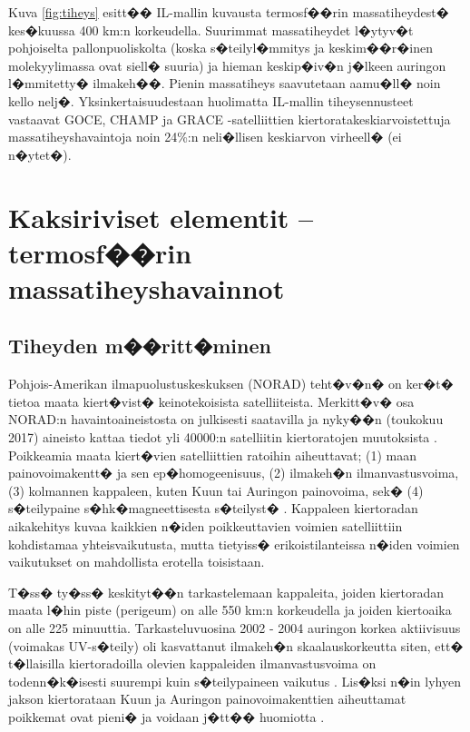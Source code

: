 \documentclass[12pt,a4paper,finnish,margin=2in]{article}
\begin{document}
Kuva \ref{fig:tiheys} esitt�� IL-mallin kuvausta termosf��rin massatiheydest� kes�kuussa 400 km:n korkeudella. Suurimmat massatiheydet l�ytyv�t pohjoiselta pallonpuoliskolta (koska s�teilyl�mmitys ja keskim��r�inen molekyylimassa ovat siell� suuria) ja hieman keskip�iv�n j�lkeen auringon l�mmitetty� ilmakeh��. Pienin massatiheys saavutetaan aamu�ll� noin kello nelj�. Yksinkertaisuudestaan huolimatta IL-mallin tiheysennusteet vastaavat GOCE, CHAMP ja GRACE -satelliittien kiertoratakeskiarvoistettuja massatiheyshavaintoja noin 24\%:n neli�llisen keskiarvon virheell� (ei n�ytet�). 

\section{Kaksiriviset elementit -- termosf��rin massatiheyshavainnot}
\subsection{Tiheyden m��ritt�minen}

Pohjois-Amerikan ilmapuolustuskeskuksen (NORAD) teht�v�n� on ker�t� tietoa maata kiert�vist� keinotekoisista satelliiteista. Merkitt�v� osa NORAD:n havaintoaineistosta on julkisesti saatavilla ja nyky��n (toukokuu 2017) aineisto kattaa tiedot yli 40000:n satelliitin kiertoratojen muutoksista \citep{spacetrack}. Poikkeamia maata kiert�vien satelliittien ratoihin aiheuttavat; (1) maan painovoimakentt� ja sen ep�homogeenisuus, (2) ilmakeh�n ilmanvastusvoima, (3) kolmannen kappaleen, kuten Kuun tai Auringon painovoima, sek� (4) s�teilypaine s�hk�magneettisesta s�teilyst� \citep[ks. esim.][s. 326]{roy_2004}. Kappaleen kiertoradan aikakehitys kuvaa kaikkien n�iden poikkeuttavien voimien satelliittiin kohdistamaa yhteisvaikutusta, mutta tietyiss� erikoistilanteissa n�iden voimien vaikutukset on mahdollista erotella toisistaan. 

T�ss� ty�ss� keskityt��n tarkastelemaan kappaleita, joiden kiertoradan maata l�hin piste (perigeum) on alle 550 km:n korkeudella ja joiden kiertoaika on alle 225 minuuttia. Tarkasteluvuosina 2002 - 2004 auringon korkea aktiivisuus (voimakas UV-s�teily) oli kasvattanut ilmakeh�n skaalauskorkeutta siten, ett� t�llaisilla kiertoradoilla olevien kappaleiden ilmanvastusvoima on todenn�k�isesti suurempi kuin s�teilypaineen vaikutus \citep{picone_2005}. Lis�ksi n�in lyhyen jakson kiertorataan Kuun ja Auringon painovoimakenttien aiheuttamat poikkemat ovat pieni� ja voidaan j�tt�� huomiotta \citep{hoots_1980}. 
\end{document}

